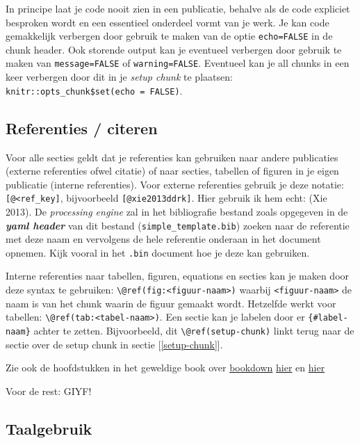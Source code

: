 \documentclass[
]{article}
\begin{document}
In principe laat je code nooit zien in een publicatie, behalve als de code expliciet besproken wordt en een essentieel onderdeel vormt van je werk. Je kan code gemakkelijk verbergen door gebruik te maken van de optie \texttt{echo=FALSE} in de chunk header. Ook storende output kan je eventueel verbergen door gebruik te maken van \texttt{message=FALSE} of \texttt{warning=FALSE}. Eventueel kan je all chunks in een keer verbergen door dit in je \emph{setup chunk} te plaatsen: \texttt{knitr::opts\_chunk\$set(echo\ =\ FALSE)}.

\hypertarget{refs}{%
\subsection{Referenties / citeren}\label{refs}}

Voor alle secties geldt dat je referenties kan gebruiken naar andere publicaties (externe referenties ofwel citatie) of naar secties, tabellen of figuren in je eigen publicatie (interne referenties). Voor externe referenties gebruik je deze notatie: \texttt{{[}@\textless{}ref\_key{]}}, bijvoorbeeld \texttt{{[}@xie2013ddrk{]}}. Hier gebruik ik hem echt: (Xie 2013). De \emph{processing engine} zal in het bibliografie bestand zoals opgegeven in de \textbf{\emph{yaml header}} van dit bestand (\texttt{simple\_template.bib}) zoeken naar de referentie met deze naam en vervolgens de hele referentie onderaan in het document opnemen. Kijk vooral in het \texttt{.bin} document hoe je deze kan gebruiken.

Interne referenties naar tabellen, figuren, equations en secties kan je maken door deze syntax te gebruiken: \texttt{\textbackslash{}@ref(fig:\textless{}figuur-naam\textgreater{})} waarbij \texttt{\textless{}figuur-naam\textgreater{}} de naam is van het chunk waarin de figuur gemaakt wordt. Hetzelfde werkt voor tabellen: \texttt{\textbackslash{}@ref(tab:\textless{}tabel-naam\textgreater{})}. Een sectie kan je labelen door er \texttt{\{\#label-naam\}} achter te zetten. Bijvoorbeeld, dit \texttt{\textbackslash{}@ref(setup-chunk)} linkt terug naar de sectie over de setup chunk in sectie {[}\ref{setup-chunk}{]}.

Zie ook de hoofdstukken in het geweldige book over \href{https://bookdown.org/yihui/bookdown/}{bookdown} \href{https://bookdown.org/yihui/bookdown/cross-references.html}{hier} en \href{https://bookdown.org/yihui/rmarkdown-cookbook/cross-ref.html}{hier}

Voor de rest: GIYF!

\hypertarget{taalgebruik}{%
\subsection{Taalgebruik}\label{taalgebruik}}
\end{document}
